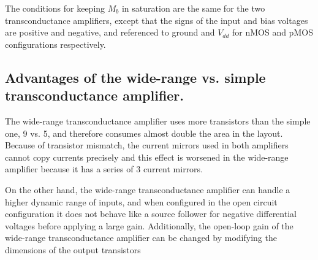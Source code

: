 The conditions for keeping \(M_b\) in saturation are the same for the two transconductance amplifiers, except that
the signs of the input and bias voltages are positive and negative, and referenced to ground and \(V_{dd}\) for nMOS and
pMOS configurations respectively.
\subsection{Advantages of the wide-range vs. simple transconductance amplifier.}
The wide-range transconductance amplifier uses more transistors than the simple one, 9 vs. 5, and therefore consumes almost double the
area in the layout. Because of transistor mismatch, the current mirrors used in both amplifiers cannot copy currents precisely and this
effect is worsened in the wide-range amplifier because it has a series of 3 current mirrors.

On the other hand, the wide-range transconductance amplifier can handle a higher dynamic range of inputs, and when configured in the open
circuit configuration it does not behave like a source follower for negative differential voltages before applying a large gain.
Additionally, the open-loop gain of the wide-range transconductance amplifier can be changed by modifying the dimensions of the 
output transistors

